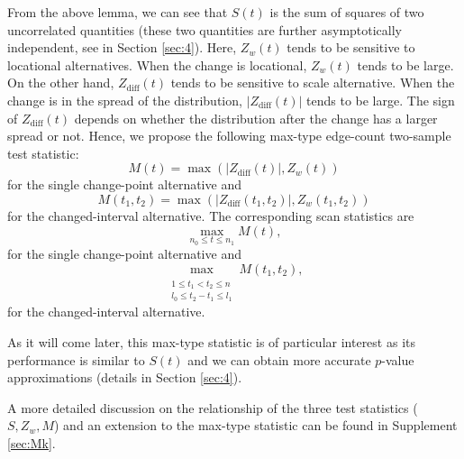 \documentclass[arxiv, preprint]{imsart}
\numberwithin{equation}{section}
\theoremstyle{plain}
\begin{document}
From the above lemma, we can see that $S(t)$ is the sum of squares of two uncorrelated quantities (these two quantities are further asymptotically independent, see in Section \ref{sec:4}). Here, $Z_w(t)$ tends to be sensitive to locational alternatives. When the change is locational, $Z_w(t)$ tends to be large. On the other hand, $Z_\text{diff}(t)$ tends to be sensitive to scale alternative. When the change is in the spread of the distribution, $|Z_\text{diff}(t)|$ tends to be large. The sign of $Z_\text{diff}(t)$ depends on whether the distribution after the change has a larger spread or not. Hence, we propose the following max-type edge-count two-sample test statistic: 
\begin{equation}
\label{eq:M}
M(t) = \max \left(|Z_\text{diff}(t)|,Z_w(t)\right) 
\end{equation}
for the single change-point alternative and  
\begin{equation}
\label{eq:M2}
M(t_1,t_2) = \max \left(|Z_\text{diff}(t_1,t_2)|,Z_w(t_1,t_2)\right) 
\end{equation}
for the changed-interval alternative. The corresponding scan statistics are
\begin{equation}
\label{eq:scan_M} \max_{n_0 \le t \le n_1} M(t),
\end{equation}
for the single change-point alternative and
\begin{equation} 
\label{eq:scan_M2} \max_{\substack{\\ 1 \le t_1 < t_2 \le n \\ l_0 \le t_2 - t_1 \le l_1}} M(t_1,t_2), \end{equation}
for the changed-interval alternative.  

As it will come later, this max-type statistic is of particular interest as its performance is similar to $S(t)$ and we can obtain more accurate $p$-value approximations (details in Section \ref{sec:4}). 

A more detailed discussion on the relationship of the three test statistics ($S, Z_w, M$) and an extension to the max-type statistic can be found in Supplement \ref{sec:Mk}.
\end{document}
